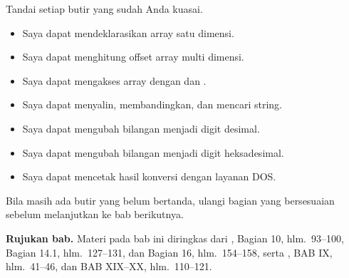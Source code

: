 \begin{checklistbox}
\vspace{1.1em}
Tandai setiap butir yang sudah Anda kuasai.

\begin{itemize}
    \item[\checkbox] Saya dapat mendeklarasikan array satu dimensi.
    \item[\checkbox] Saya dapat menghitung offset array multi
          dimensi.
    \item[\checkbox] Saya dapat mengakses array dengan  dan
          .
    \item[\checkbox] Saya dapat menyalin, membandingkan, dan mencari
          string.
    \item[\checkbox] Saya dapat mengubah bilangan menjadi digit
          desimal.
    \item[\checkbox] Saya dapat mengubah bilangan menjadi digit
          heksadesimal.
    \item[\checkbox] Saya dapat mencetak hasil konversi dengan
          layanan DOS.
\end{itemize}

\vspace{0.4em}
Bila masih ada butir yang belum bertanda, ulangi bagian yang
bersesuaian sebelum melanjutkan ke bab berikutnya.
\end{checklistbox}

\begin{infobox}
\vspace{1.1em}
\textbf{Rujukan bab.} Materi pada bab ini diringkas dari
\cite{gunawan2019}, Bagian 10, hlm.~93--100, Bagian 14.1,
hlm.~127--131, dan Bagian 16, hlm.~154--158, serta \cite{sto2001},
BAB IX, hlm.~41--46, dan BAB XIX--XX, hlm.~110--121.
\end{infobox}
